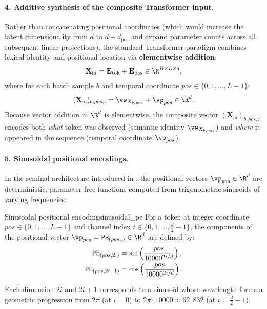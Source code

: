 \documentclass[../../main.tex]{subfiles}
\begin{document}
\paragraph{4. Additive synthesis of the composite Transformer input.}
Rather than concatenating positional coordinates (which would increase the latent dimensionality from $d$ to $d + d_{\text{pos}}$ and expand parameter counts across all subsequent linear projections), the standard Transformer paradigm combines lexical identity and positional location via \textbf{elementwise addition}:
\begin{equation}
\label{eq:composite_input_tensor}
\mathbf{X}_{\text{in}} = \mathbf{E}_{\text{tok}} + \mathbf{E}_{\text{pos}} \in \R^{B \times L \times d},
\end{equation}
where for each batch sample $b$ and temporal coordinate $pos \in \{0, 1, \dots, L-1\}$:
\begin{equation}
(\mathbf{X}_{\text{in}})_{b, pos, :} = \vw_{X_{b, pos}} + \vp_{pos} \in \R^d.
\end{equation}
Because vector addition in $\R^d$ is elementwise, the composite vector $(\mathbf{X}_{\text{in}})_{b, pos, :}$ encodes both \emph{what} token was observed (semantic identity $\vw_{X_{b, pos}}$) and \emph{where} it appeared in the sequence (temporal coordinate $\vp_{pos}$).

\paragraph{5. Sinusoidal positional encodings.}
In the seminal architecture introduced in \cite{vaswani2017}, the positional vectors $\vp_{pos} \in \R^d$ are deterministic, parameter-free functions computed from trigonometric sinusoids of varying frequencies:
\begin{definition}{Sinusoidal positional encoding}{sinusoidal_pe}
For a token at integer coordinate $pos \in \{0, 1, \dots, L-1\}$ and channel index $i \in \{0, 1, \dots, \frac{d}{2}-1\}$, the components of the positional vector $\vp_{pos} = \text{\texttt{PE}}_{(pos, :)} \in \R^d$ are defined by:
\begin{align}
\label{eq:sinusoidal_pe_even}
\text{\texttt{PE}}_{(pos, 2i)} &= \sin\left(\frac{pos}{10000^{2i / d}}\right), \\
\label{eq:sinusoidal_pe_odd}
\text{\texttt{PE}}_{(pos, 2i+1)} &= \cos\left(\frac{pos}{10000^{2i / d}}\right).
\end{align}
\end{definition}
Each dimension $2i$ and $2i+1$ corresponds to a sinusoid whose wavelength forms a geometric progression from $2\pi$ (at $i=0$) to $2\pi \cdot 10000 \approx 62{,}832$ (at $i = \frac{d}{2}-1$).
\end{document}

